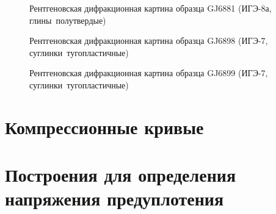   \begin{figure}[ht]
    \caption{Рентгеновская дифракционная картина образца GJ6881 (ИГЭ-8а, глины полутвердые)}\label{fig:fig}
  \end{figure}

  \begin{figure}[ht]
    \caption{Рентгеновская дифракционная картина образца GJ6898 (ИГЭ-7, суглинки тугопластичные)}\label{fig:fig}
  \end{figure}

  \begin{figure}[ht]
    \caption{Рентгеновская дифракционная картина образца GJ6899 (ИГЭ-7, суглинки тугопластичные)}\label{fig:fig}
  \end{figure}

  \chapter{Компрессионные кривые}\label{app:oedometer}
  

  \chapter{Построения для определения напряжения предуплотения}\label{app:method}
  
